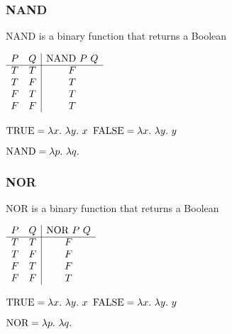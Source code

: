 \documentclass{beamer}
\begin{document}
\begin{frame}
	\frametitle{NAND}

	NAND is a binary function that returns a Boolean

	\begin{center}
		$\begin{array}{ c c | c }			
			P & Q & \NAND \ P \ Q\\
			\cline{1 - 3}
			T & T & F \\ 
			T & F & T \\ 
			F & T & T \\ 
			F & F & T
		\end{array}$
	\end{center}

	$\TRUE = \lambda x. \ \lambda y. \ x$ \hspace{4cm} $\FALSE = \lambda x. \ \lambda y. \ y$

	\vspace{0.5cm}

	$\NAND = \lambda p. \ \lambda q. \  $

	\vspace{2cm}
	
\end{frame}

\begin{frame}
	\frametitle{NOR}

	NOR is a binary function that returns a Boolean

	\begin{center}
		$\begin{array}{ c c | c }			
			P & Q & \NOR \ P \ Q\\
			\cline{1 - 3}
			T & T & F \\ 
			T & F & F \\ 
			F & T & F \\ 
			F & F & T
		\end{array}$
	\end{center}

	$\TRUE = \lambda x. \ \lambda y. \ x$ \hspace{4cm} $\FALSE = \lambda x. \ \lambda y. \ y$

	\vspace{0.5cm}

	$\NOR = \lambda p. \ \lambda q. \  $

	\vspace{2cm}
	
\end{frame}
\end{document}
